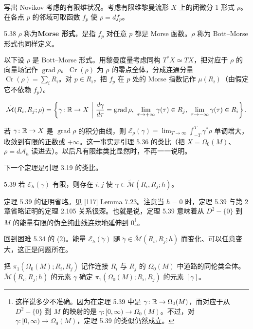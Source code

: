 写出 Novikov 考虑的有限维状况。考虑有限维黎曼流形 $X$ 上的闭微分 1 形式 $\rho$。在各点 $p$ 的邻域可取函数 $f_p$ 使 $\rho=df_p$。

\begin{definition}{5.38}
  $\rho$ 称为\textbf{Morse 形式}，是指 $f_p$ 对任意 $p$ 都是 Morse 函数。$\rho$ 称为 Bott–Morse 形式也同样定义。
\end{definition}

以下设 $\rho$ 是 Bott–Morse 形式。用黎曼度量考虑同构 $T^*X\simeq TX$，把对应于 $\rho$ 的向量场记作 $\operatorname{grad}\rho$。$\operatorname{Cr}(\rho)$ 为 $\rho$ 的零点全体，分成连通分量 $\operatorname{Cr}(\rho)=\sum_iR_i$。对 $p\in R_i$，把 $f_p$ 在 $p$ 处的 Morse 指数记作 $\mu(R_i)$（由假定它不依赖 $f_p$）。

\[
  \tilde{\mathcal{M}}(R_i,R_j;\rho)=\left\{\gamma\colon\mathbb{R}\to X\ \middle|\
  \frac{d\gamma}{d\tau}=\operatorname{grad}\rho,\
  \lim_{\tau\to+\infty}\gamma(\tau)\in R_j,\
  \lim_{\tau\to-\infty}\gamma(\tau)\in R_i\right\}.
\]

若 $\gamma\colon\mathbb{R}\to X$ 是 $\operatorname{grad}\rho$ 的积分曲线，则 $\mathcal{E}_\rho(\gamma)=\lim_{T\to\infty}\int_{-T}^T\gamma^*\rho$ 单调增大，收敛到有限的正数或 $+\infty$。这一事实是引理 5.36 的类比（把 $X=\Omega_0(M)$、$\rho=d\mathcal{A}_h$ 读进去）。以后凡有限维类比显然时，不再一一说明。

下一个定理是引理 3.19 的类比。

\begin{theorem}{5.39}
  若 $\mathcal{E}_h(\gamma)$ 有限，则存在 $i,j$ 使 $\gamma\in\tilde{\mathcal{M}}(R_i,R_j;h)$。
\end{theorem}

定理 5.39 的证明省略。见 [117] Lemma 7.23。注意当 $h=0$ 时，定理 5.39 与第 2 章省略证明的定理 2.105 关系很深。也就是说，定理 5.39 意味着从 $D^2-\{0\}$ 到 $M$ 的能量有限的伪全纯曲线连续地延伸到 0\footnote{这样说多少不准确。因为在定理 5.39 中是 $\gamma\colon\mathbb{R}\to\Omega_0(M)$，而对应于从 $D^2-\{0\}$ 到 $M$ 的映射的是 $\gamma\colon[0,\infty)\to\Omega_0(M)$。不过，对 $\gamma\colon[0,\infty)\to\Omega_0(M)$，定理 5.39 的类似仍然成立。}。

回到困难 5.34 的 (2)。能量 $\mathcal{E}_h(\tilde\gamma)$ 随 $\tilde\gamma\in\tilde{\mathcal{M}}(R_i,R_j;h)$ 而变化、可以任意变大，这正是问题所在。

把 $\pi_1(\Omega_0(M);R_i,R_j)$ 记作连接 $R_i$ 与 $R_j$ 的 $\Omega_0(M)$ 中道路的同伦类全体。$\tilde{\mathcal{M}}(R_i,R_j;h)$ 的元素 $\gamma$ 确定 $\pi_1(\Omega_0(M);R_i,R_j)$ 的元素 $[\gamma]$。


